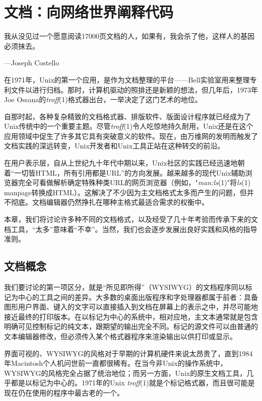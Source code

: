 \documentclass[12pt,oneside]{book}
\begin{document}
\chapter{文档：向网络世界阐释代码}
\begin{flushright}
我从没见过一个愿意阅读17000页文档的人，如果有，我会杀了他，这样人的基因必须抹去。

{\hfill —Joseph Costello }
\end{flushright}

在1971年，Unix的第一个应用，是作为文档整理的平台——Bell实验室用来整理专利文件以进行归档。那时，计算机驱动的照排还是新颖的想法，但几年后，1973年Joe Ossana的\textit{troff}(1)格式器出台，一举决定了这门艺术的地位。

自那时起，各种复杂精致的文档格式器、排版软件、版面设计程序就已经成为了Unix传统中的一个重要主题。尽管\textit{troff}(1)令人吃惊地持久耐用，Unix还是在这个应用领域中促生了许多其它具有突破意义的软件。现在，由万维网的发明而触发了文档实践的深远转变，Unix开发者和Unix工具正站在这种转交的前沿。

在用户表示层，自从上世纪九十年代中期以来，Unix社区的实践已经迅速地朝着“一切皆HTML，所有引用都是URL”的方向发展。越来越多的现代Unix辅助浏览器完全可看做解析确定特殊种类URL的网页浏览器（例如，"\textit{man:ls}(1)"将\textit{ls}(1) manpage转换成HTML）。这解决了不少因为主文档格式太多而产生的问题，但并不彻底。文档编辑器仍然挣扎在哪种主格式最适合需求的权衡中。

本章，我们将讨论许多种不同的文档格式，以及经受了几十年考验而传承下来的文档工具，“太多”意味着“不幸”。当然，我们也会逐步发展出良好实践和风格的指导准则。

\section{文档概念}
我们要讨论的第一项区分，就是“所见即所得”（WYSIWYG）的文档程序同以标记为中心的工具之间的差异。大多数的桌面出版程序和字处理器都属于前者：具备图形用户界面、键入的文字可以直接插入到文档在屏幕上的表示之中，并尽可能地接近最终的打印版本。在以标记为中心的系统中，相对应地，主文本通常就是包含明确可见控制标记的纯文本，跟期望的输出完全不同。标记的源文件可以由普通的文本编辑器修改，但必须传入某个格式器程序来渲染输出以供打印或显示。

界面可视的、WYSIWYG的风格对于早期的计算机硬件来说太昂贵了，直到1984年Macintosh个人机问世前一直都很稀有。在当今非Unix的操作系统中，WYSIWYG的风格完全占据了统治地位；而另一方面，Unix的原生文档工具，几乎都是以标记为中心的。1971年的Unix \textit{troff}(1)就是个标记格式器，而且很可能是现在仍在使用的程序中最古老的一个。
\end{document}
